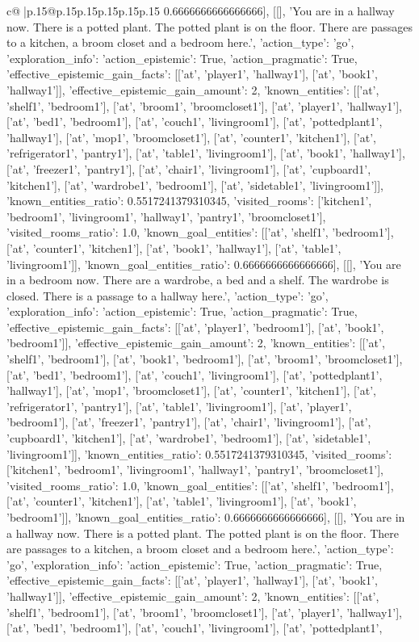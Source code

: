 \documentclass{article}
\begin{document}
{\begin{supertabular}{c@{$\;$}|p{.15\linewidth}@{}p{.15\linewidth}p{.15\linewidth}p{.15\linewidth}p{.15\linewidth}p{.15\linewidth}}
{{{0.6666666666666666}}], [[], 'You are in a hallway now. There is a potted plant. The potted plant is on the floor. There are passages to a kitchen, a broom closet and a bedroom here.', {'action_type': 'go', 'exploration_info': {'action_epistemic': True, 'action_pragmatic': True, 'effective_epistemic_gain_facts': [['at', 'player1', 'hallway1'], ['at', 'book1', 'hallway1']], 'effective_epistemic_gain_amount': 2, 'known_entities': [['at', 'shelf1', 'bedroom1'], ['at', 'broom1', 'broomcloset1'], ['at', 'player1', 'hallway1'], ['at', 'bed1', 'bedroom1'], ['at', 'couch1', 'livingroom1'], ['at', 'pottedplant1', 'hallway1'], ['at', 'mop1', 'broomcloset1'], ['at', 'counter1', 'kitchen1'], ['at', 'refrigerator1', 'pantry1'], ['at', 'table1', 'livingroom1'], ['at', 'book1', 'hallway1'], ['at', 'freezer1', 'pantry1'], ['at', 'chair1', 'livingroom1'], ['at', 'cupboard1', 'kitchen1'], ['at', 'wardrobe1', 'bedroom1'], ['at', 'sidetable1', 'livingroom1']], 'known_entities_ratio': 0.5517241379310345, 'visited_rooms': ['kitchen1', 'bedroom1', 'livingroom1', 'hallway1', 'pantry1', 'broomcloset1'], 'visited_rooms_ratio': 1.0, 'known_goal_entities': [['at', 'shelf1', 'bedroom1'], ['at', 'counter1', 'kitchen1'], ['at', 'book1', 'hallway1'], ['at', 'table1', 'livingroom1']], 'known_goal_entities_ratio': 0.6666666666666666}}], [[], 'You are in a bedroom now. There are a wardrobe, a bed and a shelf. The wardrobe is closed. There is a passage to a hallway here.', {'action_type': 'go', 'exploration_info': {'action_epistemic': True, 'action_pragmatic': True, 'effective_epistemic_gain_facts': [['at', 'player1', 'bedroom1'], ['at', 'book1', 'bedroom1']], 'effective_epistemic_gain_amount': 2, 'known_entities': [['at', 'shelf1', 'bedroom1'], ['at', 'book1', 'bedroom1'], ['at', 'broom1', 'broomcloset1'], ['at', 'bed1', 'bedroom1'], ['at', 'couch1', 'livingroom1'], ['at', 'pottedplant1', 'hallway1'], ['at', 'mop1', 'broomcloset1'], ['at', 'counter1', 'kitchen1'], ['at', 'refrigerator1', 'pantry1'], ['at', 'table1', 'livingroom1'], ['at', 'player1', 'bedroom1'], ['at', 'freezer1', 'pantry1'], ['at', 'chair1', 'livingroom1'], ['at', 'cupboard1', 'kitchen1'], ['at', 'wardrobe1', 'bedroom1'], ['at', 'sidetable1', 'livingroom1']], 'known_entities_ratio': 0.5517241379310345, 'visited_rooms': ['kitchen1', 'bedroom1', 'livingroom1', 'hallway1', 'pantry1', 'broomcloset1'], 'visited_rooms_ratio': 1.0, 'known_goal_entities': [['at', 'shelf1', 'bedroom1'], ['at', 'counter1', 'kitchen1'], ['at', 'table1', 'livingroom1'], ['at', 'book1', 'bedroom1']], 'known_goal_entities_ratio': 0.6666666666666666}}], [[], 'You are in a hallway now. There is a potted plant. The potted plant is on the floor. There are passages to a kitchen, a broom closet and a bedroom here.', {'action_type': 'go', 'exploration_info': {'action_epistemic': True, 'action_pragmatic': True, 'effective_epistemic_gain_facts': [['at', 'player1', 'hallway1'], ['at', 'book1', 'hallway1']], 'effective_epistemic_gain_amount': 2, 'known_entities': [['at', 'shelf1', 'bedroom1'], ['at', 'broom1', 'broomcloset1'], ['at', 'player1', 'hallway1'], ['at', 'bed1', 'bedroom1'], ['at', 'couch1', 'livingroom1'], ['at', 'pottedplant1', }}}
\end{supertabular}}
\end{document}
